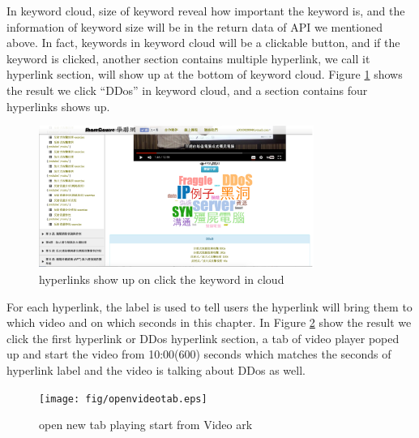 In keyword cloud, size of keyword reveal how important the keyword is, and the information of keyword size will be in the return data of API we mentioned above.
In fact, keywords in keyword cloud will be a clickable button, and if the keyword is clicked, another section contains multiple hyperlink, we call it hyperlink section, will show up at the bottom of keyword cloud.
Figure \ref{fig:keywordurl} shows the result we click ``DDos'' in keyword cloud, and a section contains four hyperlinks shows up.
\begin{figure}[H]
    \centering
    \includegraphics[width = 0.8\textwidth]{fig/keywordurl.eps}
    \caption{hyperlinks show up on click the keyword in cloud}
    \label{fig:keywordurl}
\end{figure}

For each hyperlink, the label is used to tell users the hyperlink will bring them to which video and on which seconds in this chapter.
In Figure \ref{fig:openvideotab} show the result we click the first hyperlink or DDos hyperlink section, a tab of video player poped up and start the video from 10:00(600) seconds which matches the seconds of hyperlink label and the video is talking about DDos as well.

\begin{figure}[H]
    \centering
    \texttt{[image: fig/openvideotab.eps]}
    \caption{open new tab playing start from Video ark}
    \label{fig:openvideotab}
\end{figure}
